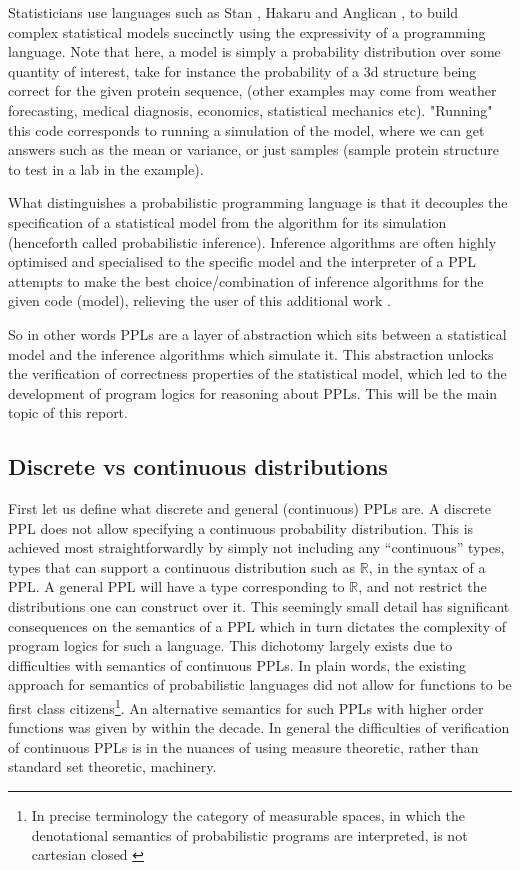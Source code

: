 Statisticians use languages such as Stan \citep{stan}, Hakaru \citep{hakaru} and Anglican \citep{anglican}, to build complex statistical models
succinctly using the expressivity of a programming language. Note that here, a model is simply a probability distribution over some quantity of
interest, take for instance the probability of a 3d structure being correct for the given protein sequence, (other examples may come from
weather forecasting, medical diagnosis, economics, statistical mechanics etc).
"Running" this code corresponds to running a simulation of the model, where we can get answers such as the mean or variance, or just samples
(sample protein structure to test in a lab in the example).

What distinguishes a probabilistic programming language is that it decouples the specification of a statistical model from the algorithm for
its simulation (henceforth called probabilistic inference). Inference algorithms are often highly optimised and specialised to the specific model
and the interpreter of a PPL attempts to make the best choice/combination of inference algorithms for the given code (model), relieving
the user of this additional work \citep{ppl}.

So in other words PPLs are a layer of abstraction which sits between a statistical model and the inference algorithms which simulate it.
This abstraction unlocks the verification of correctness properties of the statistical model, which led to the development of program
logics for reasoning about PPLs. This will be the main topic of this report.


\subsection{Discrete vs continuous distributions}
\label{discont}
First let us define what discrete and general (continuous) PPLs are. A discrete PPL does not allow specifying a continuous probability distribution.
This is achieved most straightforwardly by simply not including any ``continuous'' types, types that can support a continuous distribution such as $\mathbb{R}$, in the syntax of a PPL.
A general PPL will have a type corresponding to $\mathbb{R}$, and not restrict the distributions one can construct over it. This seemingly small detail has significant consequences on the semantics 
of a PPL which in turn dictates the complexity of program logics for such a language. This dichotomy largely exists due to difficulties
with semantics of continuous PPLs. In plain words, the existing approach for semantics of probabilistic languages did not allow for functions to be first class
citizens\footnote{In precise terminology the category of measurable spaces, in which the denotational semantics of probabilistic programs
are interpreted, is not cartesian closed \citep{aumann}}.
An alternative semantics for such PPLs with higher order functions was given by \citep{prob-semantics} within the decade. In general the difficulties of verification
of continuous PPLs is in the nuances of using measure theoretic, rather than standard set theoretic, machinery.

